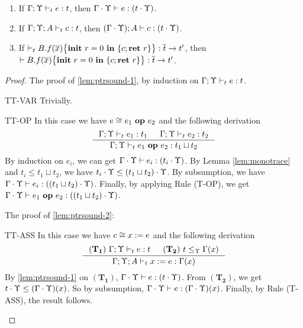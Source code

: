 {{{\begin{lemma}\label{lem:ptrsound}
\begin{enumerate}[label=(\alph*),topsep=1pt,itemsep=-1ex,partopsep=1ex,parsep=0ex]
\item\label{lem:ptrsound-1} If $\Gamma;\Upsilon\vdash_{t} e : t$, then $\Gamma\cdot\Upsilon\vdash e : (t\cdot\Upsilon)$.\\
\item\label{lem:ptrsound-2} If $\Gamma;\Upsilon; A \vdash_{t} c : t$, then $(\Gamma\cdot\Upsilon); A \vdash c : (t\cdot\Upsilon)$.\\
\item\label{lem:ptrsound-3} If $\vdash_{t} {B.f}(\overline{x})\big\{{{\textbf{init}~ {r}=0 ~\textbf{in}~\{{c};\textbf{ret}~{r}\}}}\big\}  : \overline{t}\xrightarrow{} t'$, then $ \vdash {B.f}(\overline{x})\big\{{{\textbf{init}~ {r}=0 ~\textbf{in}~\{{c};\textbf{ret}~{r}\}}}\big\}  : \overline{t}\xrightarrow{} t'$.
\end{enumerate}
\end{lemma}
\begin{proof}
The proof of {\ref{lem:ptrsound-1}}, by induction on $\Gamma;\Upsilon \vdash_{t} e: t$.
\begin{ProofEnumDesc}
\item[TT-VAR] Trivially.
\item[TT-OP]  In this case we have $e \cong {e_1}~\textbf{op}~{e_2}$ and the following derivation
\begin{equation*}
\inference
{\Gamma;\trace \vdash_{t} e_1: t_1 & \Gamma;\trace\vdash_{t} e_2: t_2}
{\Gamma;\trace \vdash_{t} \leOP{e_1}{e_2} : t_1\sqcup t_2}
\end{equation*}
By induction on $e_i$, we can get $\Gamma\cdot\Upsilon \vdash e_i : (t_i\cdot\Upsilon)$.
By Lemma \ref{lem:monotrace} and  $t_i \leq t_1\sqcup t_2$, we have $t_i\cdot \Upsilon \leq (t_1\sqcup t_2)\cdot\Upsilon $.
By subsumption, we have $\Gamma\cdot\Upsilon \vdash e_i : ((t_1\sqcup t_2)\cdot\Upsilon) $.
Finally, by applying Rule {(T-OP)}, we get $\Gamma\cdot\Upsilon \vdash  {e_1}~\textbf{op}~{e_2} :((t_1\sqcup t_2)\cdot\Upsilon)  $.
\end{ProofEnumDesc}
The proof of {\ref{lem:ptrsound-2}}:
\begin{ProofEnumDesc}

\item[TT-ASS] In this case we have $c \cong {x}:={e}$ and the following derivation
\begin{equation*}
\inference
{(\mathbf{T_1}) ~ \Gamma;\trace \vdash_{t} e : t & (\mathbf{T_2}) ~ t \leq_{\trace} \Gamma(x)}
{\Gamma;\trace; A \vdash_{t} \lcASS{x}{e} : \Gamma(x)}
\end{equation*}
By \ref{lem:ptrsound-1} on $(\mathbf{T_1})$,  $\Gamma\cdot\Upsilon \vdash e : (t\cdot \Upsilon)$.
From $(\mathbf{T_2})$, we get $ t\cdot \Upsilon \leq (\Gamma\cdot\Upsilon)(x)$.
So by subsumption, $\Gamma\cdot\Upsilon \vdash e : (\Gamma\cdot\Upsilon)(x)$.
Finally, by Rule {(T-ASS)}, the result follows.


\end{ProofEnumDesc}
\end{proof}}}}
